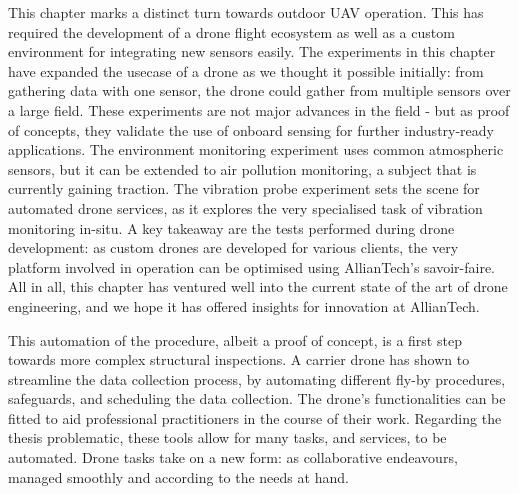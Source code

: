 This chapter marks a distinct turn towards outdoor UAV operation. This has required the development of a drone flight ecosystem as well as a custom environment for integrating new sensors easily. The experiments in this chapter have expanded the usecase of a drone as we thought it possible initially: from gathering data with one sensor, the drone could gather from multiple sensors over a large field. These experiments are not major advances in the field - but as proof of concepts, they validate the use of onboard sensing for further industry-ready applications. The environment monitoring experiment uses common atmospheric sensors, but it can be extended to air pollution monitoring, a subject that is currently gaining traction. The vibration probe experiment sets the scene for automated drone services, as it explores the very specialised task of vibration monitoring in-situ. A key takeaway are the tests performed during drone development: as custom drones are developed for various clients, the very platform involved in operation can be optimised using AllianTech's savoir-faire. All in all, this chapter has ventured well into the current state of the art of drone engineering, and we hope it has offered insights for innovation at AllianTech.

This automation of the procedure, albeit a proof of concept, is a first step towards more complex structural inspections. A carrier drone has shown to streamline the data collection process, by automating different fly-by procedures, safeguards, and scheduling the data collection. The drone's functionalities can be fitted to aid professional practitioners in the course of their work. Regarding the thesis problematic, these tools allow for many tasks, and services, to be automated. Drone tasks take on a new form: as collaborative endeavours, managed smoothly and according to the needs at hand.


